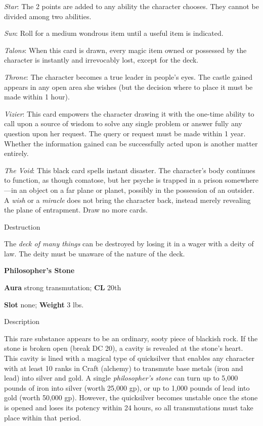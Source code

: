 \textit{Star}: The 2 points are added to any ability the character chooses. They cannot be divided among two abilities. 
				
\textit{Sun}: Roll for a medium wondrous item until a useful item is indicated.
				
\textit{Talons}: When this card is drawn, every magic item owned or possessed by the character is instantly and irrevocably lost, except for the deck.
				
\textit{Throne}: The character becomes a true leader in people's eyes. The castle gained appears in any open area she wishes (but the decision where to place it must be made within 1 hour).
				
\textit{Vizier}: This card empowers the character drawing it with the one-time ability to call upon a source of wisdom to solve any single problem or answer fully any question upon her request. The query or request must be made within 1 year. Whether the information gained can be successfully acted upon is another matter entirely.
				
\textit{The Void}: This black card spells instant disaster. The character's body continues to function, as though comatose, but her psyche is trapped in a prison somewhere---in an object on a far plane or planet, possibly in the possession of an outsider. A \textit{wish }or a \textit{miracle }does not bring the character back, instead merely revealing the plane of entrapment. Draw no more cards. 
				
Destruction
				
The \textit{deck of many things} can be destroyed by losing it in a wager with a deity of law. The deity must be unaware of the nature of the deck.
				
\textbf{Philosopher's Stone}
				
\textbf{Aura} strong transmutation; \textbf{CL} 20th
				
\textbf{Slot} none; \textbf{Weight} 3 lbs.
				
Description
				
This rare substance appears to be an ordinary, sooty piece of blackish rock. If the stone is broken open (break DC 20), a cavity is revealed at the stone's heart. This cavity is lined with a magical type of quicksilver that enables any character with at least 10 ranks in Craft (alchemy) to transmute base metals (iron and lead) into silver and gold. A single \textit{philosopher's stone }can turn up to 5,000 pounds of iron into silver (worth 25,000 gp), or up to 1,000 pounds of lead into gold (worth 50,000 gp). However, the quicksilver becomes unstable once the stone is opened and loses its potency within 24 hours, so all transmutations must take place within that period.
				

